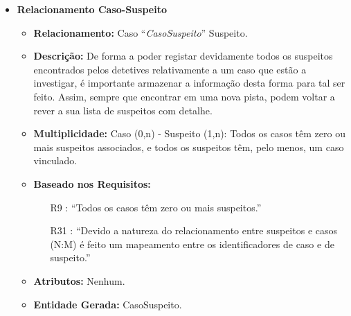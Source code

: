 \documentclass[a4paper,12pt]{scrreprt}
\begin{document}
\begin{itemize}
        \clearpage
        
        \item\textbf{Relacionamento Caso-Suspeito}
        \begin{itemize}
            \item\textbf{Relacionamento:} Caso “\textit{CasoSuspeito}” Suspeito.
            \item\textbf{Descrição:} De forma a poder registar devidamente todos os suspeitos encontrados pelos detetives relativamente a um caso que estão a investigar, é importante armazenar a informação desta forma para tal ser feito. Assim, sempre que encontrar em uma nova pista, podem voltar a rever a sua lista de suspeitos com detalhe.
            \item\textbf{Multiplicidade:} Caso (0,n) - Suspeito (1,n): Todos os casos têm zero ou mais suspeitos associados, e todos os suspeitos têm, pelo menos, um caso vinculado.
            \item\textbf{Baseado nos Requisitos:}
            \begin{itemize}
                \item [R9]: “Todos os casos têm zero ou mais suspeitos.”
                \item [R31]: “Devido a natureza do relacionamento entre suspeitos e casos (N:M) é feito um mapeamento entre os identificadores de caso e de suspeito.”
            \end{itemize}
            \item\textbf{Atributos:} Nenhum.
            \item\textbf{Entidade Gerada:} CasoSuspeito.
        \end{itemize}

        \vspace{0.75cm}
    

\end{itemize}
\end{document}
